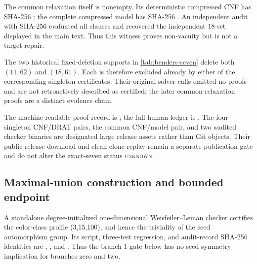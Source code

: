 The common relaxation itself is nonempty.  Its deterministic compressed CNF
has SHA-256
;
the complete compressed model has SHA-256
.
An independent audit with SHA-256
evaluated all clauses and recovered the independent \(18\)-set displayed in
the main text.  Thus this witness proves non-vacuity but is not a target
repair.

The two historical fixed-deletion supports in
\cref{tab:benders-seven} delete both \((11,62)\) and \((18,61)\).  Each is
therefore excluded already by either of the corresponding singleton
certificates.  Their original solver calls emitted no proofs and are not
retroactively described as certified; the later common-relaxation proofs are
a distinct evidence chain.

The machine-readable proof record is
; the full
human ledger is
.
The four singleton CNF/DRAT pairs, the common CNF/model pair, and two audited
checker binaries are designated large release assets rather than Git objects.
Their public-release download and clean-clone replay remain a separate
publication gate and do not alter the exact-seven status \textsc{unknown}.

\subsection{Maximal-union construction and bounded endpoint}

A standalone degree-initialized one-dimensional Weisfeiler--Leman checker
certifies the color-class profile (3,15,100), and hence the triviality of the
seed automorphism group.  Its script, three-test regression, and audit-record
SHA-256 identities are
,
,
and
.
Thus the branch-1 gate below has no seed-symmetry implication for branches zero
and two.

